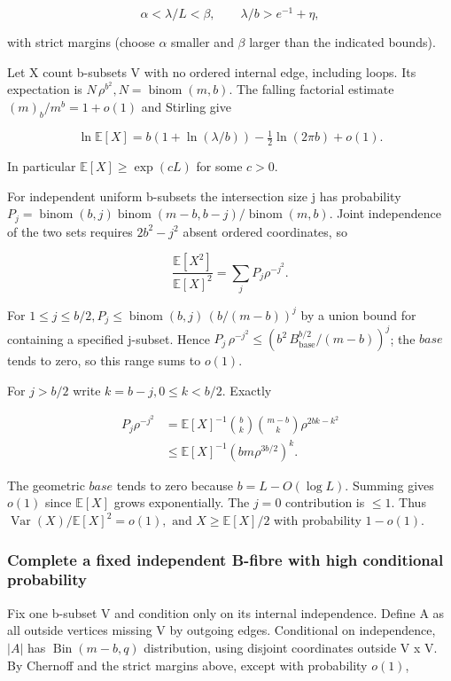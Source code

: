 \documentclass[11pt]{article}
\begin{document}
\[
\alpha<\lambda/L<\beta,\qquad\lambda/b>e^{-1}+\eta,
\]

with strict margins (choose $\alpha $ smaller and $\beta $ larger than the indicated bounds).

Let X count b-subsets V with no ordered internal edge, including loops. Its expectation is $N\,\rho ^{b^{2}}, N=\operatorname{binom}(m,b)$. The falling factorial estimate $(m)_{b}/m^{b}=1+o(1)$ and Stirling give

\[
\ln\mathbb E[X]=b(1+\ln(\lambda/b))-\tfrac12\ln(2\pi b)+o(1).
\]

In particular $\mathbb E[X]\geq \exp (c L)$ for some $c>0$.

For independent uniform b-subsets the intersection size j has probability $P_{j}=\operatorname{binom}(b,j)\operatorname{binom}(m-b,b-j)/\operatorname{binom}(m,b)$. Joint independence of the two sets requires $2b^{2}-j^{2}$ absent ordered coordinates, so

\[
\frac{\mathbb E[X^2]}{\mathbb E[X]^2}=\sum_j P_j\rho^{-j^2}.
\]

For $1\leq j\leq b/2, P_{j} \leq  \operatorname{binom}(b,j)\,(b/(m-b))^{j}$ by a union bound for containing a specified j-subset. Hence $P_{j}\,\rho ^{-j^{2}} \leq  (b^{2}\,B_{\mathrm{base}}^{b/2}/(m-b))^{j}$; the $base$ tends to zero, so this range sums to $o(1)$.

For $j>b/2$ write $k=b-j, 0\leq k<b/2$. Exactly

\[
\begin{aligned}
P_j\rho^{-j^2}
&=\mathbb E[X]^{-1}\binom bk\binom{m-b}{k}\rho^{2bk-k^2}\\
&\leq\mathbb E[X]^{-1}(bm\rho^{3b/2})^k.
\end{aligned}
\]

The geometric $base$ tends to zero because $b=L-O(\log  L)$. Summing gives $o(1)$ since $\mathbb E[X]$ grows exponentially. The $j=0$ contribution is $\leq 1$. Thus $\operatorname{Var}(X)/\mathbb E[X]^{2}=o(1), \text{ and } X\geq \mathbb E[X]/2$ with probability $1-o(1)$.

\subsubsection{Complete a fixed independent B-fibre with high conditional probability}

Fix one b-subset V and condition only on its internal independence. Define A as all outside vertices missing V by outgoing edges. Conditional on independence, $|A|$ has $\operatorname{Bin}(m-b,q)$ distribution, using disjoint coordinates outside V x V. By Chernoff and the strict margins above, except with probability $o(1)$,
\end{document}
